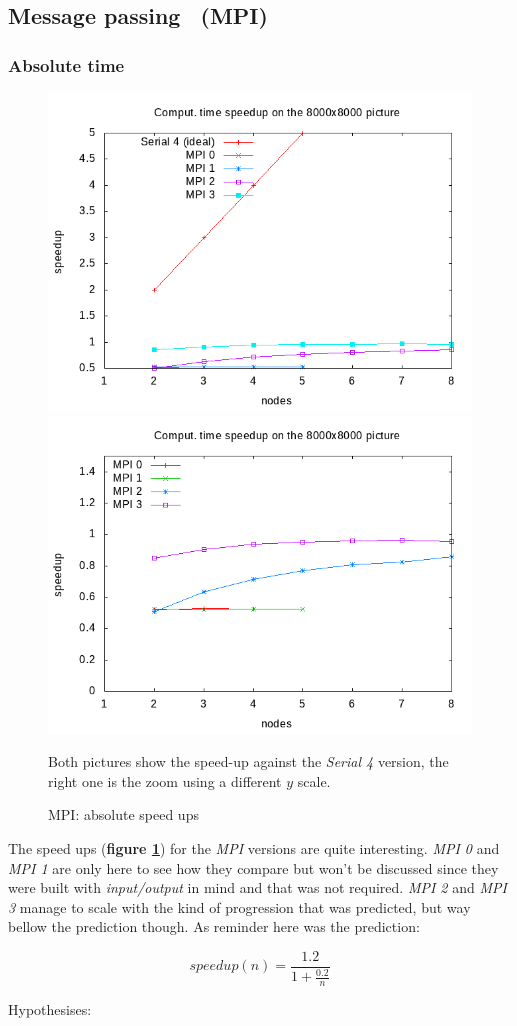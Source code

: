 \documentclass[10pt,a4paper]{article}
\begin{document}
\subsection{Message passing ~(MPI)}

\subsubsection{Absolute time}

\begin{figure}[ht]
\begin{center}
\includegraphics[width=.45\linewidth]{../../plots/mpi_speedup_compute_8000.png}
\includegraphics[width=.45\linewidth]{../../plots/mpi_speedup_compute_8000_no_ideal.png}
\end{center}
\caption{MPI: absolute speed ups}{Both pictures show the speed-up against the
\emph{Serial 4} version, the right one is the zoom using a different $y$ scale.}
\label{fig:mpis}
\end{figure}

The speed ups (\textbf{figure \ref{fig:mpis}}) for the \emph{MPI} versions are
quite interesting. \emph{MPI 0} and \emph{MPI 1} are only here to see how they
compare but won't be discussed since they were built with \emph{input/output}
in mind and that was not required. \emph{MPI 2} and \emph{MPI 3} manage to
scale with the kind of progression that was predicted, but way bellow the
prediction though. As reminder here was the prediction:

$$speedup(n) = \frac{1.2}{1 + \frac{0.2}{n}}$$

Hypothesises:
\end{document}
